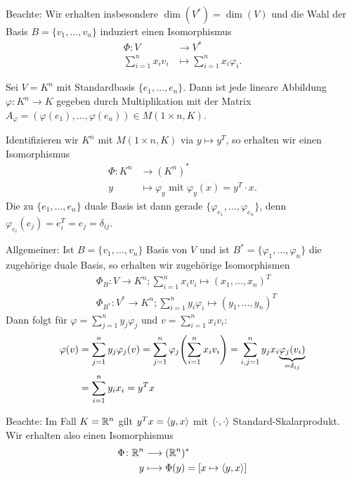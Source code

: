 Beachte: Wir erhalten insbesondere $\dim(V^*) = \dim(V)$ und die Wahl der Basis $B = \{v_1,\dots,v_n\}$ induziert einen Isomorphismus
\newpage
\begin{align*}
	\Phi\colon V &\longrightarrow V^* \\
	\sum_{i=1}^{n} x_i v_i &\longmapsto \sum_{i=1}^{n} x_i \varphi_i.
\end{align*}

\begin{beispiel}
	\label{bsp:12.4}
	Sei $V = K^n$ mit Standardbasis $\{e_1,\dots,e_n\}$.
	Dann ist jede lineare Abbildung $\varphi \colon K^n \rightarrow K$ gegeben durch Multiplikation mit der Matrix $A_\varphi = (\varphi(e_1),\dots,\varphi(e_n)) \in M(1 \times n,K)$.
	
	Identifizieren wir $K^n$ mit $M(1 \times n, K)$ via $y \mapsto y^T$, so erhalten wir einen Isomorphismus
	\begin{align*}
		\Phi\colon K^n &\longrightarrow (K^n)^* \\
		y &\longmapsto \varphi_y \text{ mit } \varphi_y(x) = y^T \cdot x.
	\end{align*}
	Die zu $\{e_1,\dots,e_n\}$ duale Basis ist dann gerade $\{\varphi_{e_1},\dots,\varphi_{e_n}\}$, denn $\varphi_{e_i}(e_j) = e_i^T = e_j = \delta_{ij}$.
\end{beispiel}

Allgemeiner: Ist $B = \{v_1,\dots,v_n\}$ Basis von $V$ und ist $B^* = \{\varphi_1,\dots,\varphi_n\}$ die zugehörige duale Basis, so erhalten wir zugehörige Isomorphismen
\begin{align*}
	&\Phi_B\colon V \rightarrow K^n; \sum_{i=1}^{n} x_iv_i \mapsto (x_1,\dots,x_n)^T \\
	&\Phi_{B^*}\colon V^* \rightarrow K^n; \sum_{i=1}^{n} y_i\varphi_i \mapsto (y_1,\dots,y_n)^T
\end{align*}
Dann folgt für $\varphi = \sum_{j=1}^{n} y_j \varphi_j$ und $v = \sum_{i=1}^{n} x_i v_i$:
\begin{align*}
	\varphi(v) &= \sum_{j=1}^{n} y_j \varphi_j(v) = \sum_{j=1}^{n} \varphi_j \enb{\sum_{i=1}^{n} x_i v_i} = \sum_{i,j=1}^{n} y_j x_i \Underbrace{\varphi_j(v_i)}{=\delta_{ij}} \\
	&= \sum_{i=1}^{n} y_i x_i = y^Tx
\end{align*}

Beachte: Im Fall $K = \mathbb{R}^n$ gilt $y^Tx = \left\langle y,x\right\rangle$ mit $\left\langle\cdot,\cdot\right\rangle$ Standard-Skalarprodukt.
Wir erhalten also einen Isomorphismus
\begin{align*}
	\Phi \colon \mathbb{R}^n &\longrightarrow (\mathbb{R}^n)^* \\
	y &\longmapsto \Phi(y) = [x \mapsto \left\langle y,x\right\rangle]
\end{align*}

